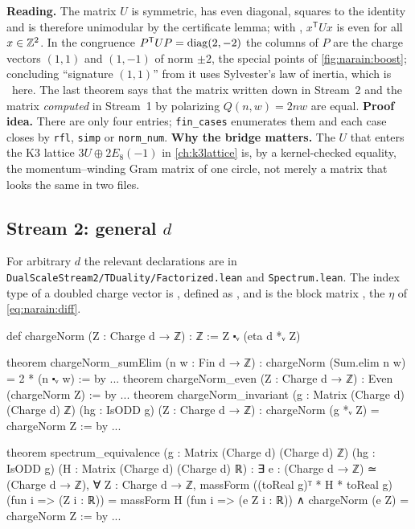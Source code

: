 \begin{leanbox}
\textbf{Reading.} The matrix $U$ is symmetric, has even diagonal, squares to the identity and
is therefore unimodular by the certificate lemma; with
, $x^{\mathsf T}Ux$ is even for all $x\in\mathbb{Z}^2$. In the
congruence $P^{\mathsf T}UP=\operatorname{diag}(2,-2)$ the columns of $P$ are the charge vectors $(1,1)$ and
$(1,-1)$ of norm $\pm2$, the special points of \cref{fig:narain:boost}; concluding
``signature $(1,1)$'' from it uses Sylvester's law of inertia, which is \TL\ here. The last
theorem says that the matrix written down in Stream~2 and the matrix \emph{computed} in
Stream~1 by polarizing $Q(n,w)=2nw$ are equal. \textbf{Proof idea.} There are only four entries; \texttt{fin\_cases} enumerates them
and each case closes by \texttt{rfl}, \texttt{simp} or \texttt{norm\_num}. \textbf{Why the bridge matters.} The $U$ that enters the K3 lattice $3U\oplus2E_8(-1)$ in
\cref{ch:k3lattice} is, by a kernel-checked equality, the momentum--winding Gram matrix of
one circle, not merely a matrix that looks the same in two files.
\end{leanbox}

\subsection{Stream 2: general \texorpdfstring{$d$}{d}}

For arbitrary $d$ the relevant declarations are in
\texttt{DualScaleStream2/TDuality/Factorized.lean} and \texttt{Spectrum.lean}. The index type
of a doubled charge vector is , defined as , and
 is the block matrix , the $\eta$ of
\eqref{eq:narain:diff}.

\begin{leancode}
def chargeNorm (Z : Charge d → ℤ) : ℤ := Z ⬝ᵥ (eta d *ᵥ Z)

theorem chargeNorm_sumElim (n w : Fin d → ℤ) :
    chargeNorm (Sum.elim n w) = 2 * (n ⬝ᵥ w) := by ...
theorem chargeNorm_even (Z : Charge d → ℤ) : Even (chargeNorm Z) := by ...
theorem chargeNorm_invariant (g : Matrix (Charge d) (Charge d) ℤ)
    (hg : IsODD g) (Z : Charge d → ℤ) :
    chargeNorm (g *ᵥ Z) = chargeNorm Z := by ...

theorem spectrum_equivalence (g : Matrix (Charge d) (Charge d) ℤ)
    (hg : IsODD g) (H : Matrix (Charge d) (Charge d) ℝ) :
    ∃ e : (Charge d → ℤ) ≃ (Charge d → ℤ), ∀ Z : Charge d → ℤ,
      massForm ((toReal g)ᵀ * H * toReal g) (fun i => (Z i : ℝ)) =
        massForm H (fun i => (e Z i : ℝ)) ∧
      chargeNorm (e Z) = chargeNorm Z := by ...
\end{leancode}

